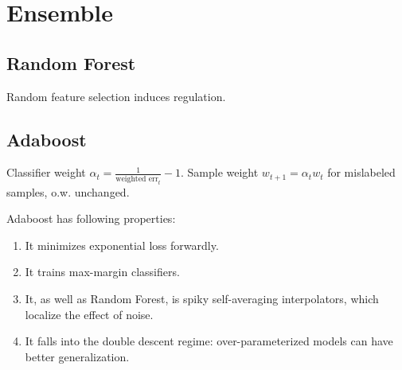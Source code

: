 \section{Ensemble}

\subsection*{Random Forest}

Random feature selection induces regulation.

\subsection*{Adaboost}

Classifier weight $\alpha_t=\frac{1}{\text{weighted err}_t}-1$. Sample weight $w_{t+1}=\alpha_t w_t$ for mislabeled samples, o.w. unchanged.

Adaboost has following properties:
\begin{enumerate}
    \item It minimizes exponential loss forwardly.
    \item It trains max-margin classifiers.
    \item It, as well as Random Forest, is spiky self-averaging interpolators, which localize the effect of noise.
    \item It falls into the double descent regime: over-parameterized models can have better generalization.
\end{enumerate}